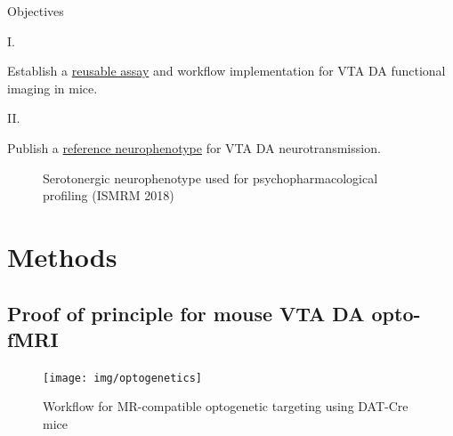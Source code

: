 			\begin{frame}{Objectives}
				\begin{minipage}{.38\textwidth}
					\vspace{-3em}
					\centerline{I.}
					Establish a \underline{reusable assay} and workflow implementation for VTA DA functional imaging in mice.

					\vspace{2.5em}
					\centerline{II.}
					Publish a \underline{reference neurophenotype} for VTA DA neurotransmission.
				\end{minipage}\hfill
				\begin{minipage}{.6\textwidth}
					\vspace{-1.5em}
                                        \begin{figure}[htp] 
						\vspace{-1.5em}
						\caption{\centering Serotonergic neurophenotype used for psychopharmacological profiling (ISMRM 2018) \cite{phd}}
                                        \end{figure}
                                \end{minipage}
			\end{frame}
	\section{Methods}
		\subsection{Proof of principle for mouse VTA DA opto-fMRI}
			\begin{frame}{}
				\begin{figure}
					\vspace{.7em}
					\centering
					\texttt{[image: img/optogenetics]}
					\caption{Workflow for MR-compatible optogenetic targeting using DAT-Cre mice \cite{dat}}
				\end{figure}
			\end{frame}
